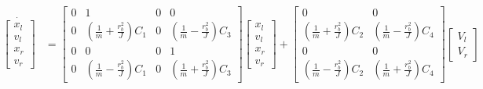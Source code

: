 \begin{align*}
  \dot{\begin{bmatrix}
    x_l \\
    v_l \\
    x_r \\
    v_r
  \end{bmatrix}} &=
  \begin{bmatrix}
    0 & 1 & 0 & 0 \\
    0 & \left(\frac{1}{m} + \frac{r_b^2}{J}\right) C_1 &
    0 & \left(\frac{1}{m} - \frac{r_b^2}{J}\right) C_3 \\
    0 & 0 & 0 & 1 \\
    0 & \left(\frac{1}{m} - \frac{r_b^2}{J}\right) C_1 &
    0 & \left(\frac{1}{m} + \frac{r_b^2}{J}\right) C_3
  \end{bmatrix}
  \begin{bmatrix}
    x_l \\
    v_l \\
    x_r \\
    v_r
  \end{bmatrix} +
  \begin{bmatrix}
    0 & 0 \\
    \left(\frac{1}{m} + \frac{r_b^2}{J}\right) C_2 &
    \left(\frac{1}{m} - \frac{r_b^2}{J}\right) C_4 \\
    0 & 0 \\
    \left(\frac{1}{m} - \frac{r_b^2}{J}\right) C_2 &
    \left(\frac{1}{m} + \frac{r_b^2}{J}\right) C_4
  \end{bmatrix}
  \begin{bmatrix}
    V_l \\
    V_r
  \end{bmatrix}
\end{align*}

